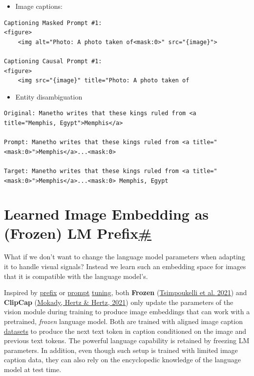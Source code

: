 \begin{itemize}
\tightlist
\item
  Image captions:
\end{itemize}

\begin{verbatim}
Captioning Masked Prompt #1: 
<figure>
    <img alt="Photo: A photo taken of<mask:0>" src="{image}">

Captioning Causal Prompt #1: 
<figure>
    <img src="{image}" title="Photo: A photo taken of
\end{verbatim}

\begin{itemize}
\tightlist
\item
  Entity disambiguation
\end{itemize}

\begin{verbatim}
Original: Manetho writes that these kings ruled from <a title="Memphis, Egypt">Memphis</a>

Prompt: Manetho writes that these kings ruled from <a title="<mask:0>">Memphis</a>...<mask:0>

Target: Manetho writes that these kings ruled from <a title="<mask:0>">Memphis</a>...<mask:0> Memphis, Egypt
\end{verbatim}

\section{\texorpdfstring{Learned Image Embedding as (Frozen) LM Prefix\hyperref[learned-image-embedding-as-frozen-lm-prefix]{\#}}{Learned Image Embedding as (Frozen) LM Prefix\#}}\label{learned-image-embedding-as-frozen-lm-prefix}

What if we don't want to change the language model parameters when adapting it to handle visual signals? Instead we learn such an embedding space for images that it is compatible with the language model's.

Inspired by \href{https://arxiv.org/abs/2101.00190}{prefix} or \href{https://arxiv.org/abs/2104.08691}{prompt} \href{https://lilianweng.github.io/posts/2021-01-02-controllable-text-generation/\#prefix-tuning}{tuning}, both \textbf{Frozen} (\href{https://arxiv.org/abs/2106.13884}{Tsimpoukelli et al. 2021}) and \textbf{ClipCap} (\href{https://arxiv.org/abs/2111.09734}{Mokady, Hertz \& Hertz, 2021}) only update the parameters of the vision module during training to produce image embeddings that can work with a pretrained, \emph{frozen} language model. Both are trained with aligned image caption \hyperref[image-caption-datasets]{datasets} to produce the next text token in caption conditioned on the image and previous text tokens. The powerful language capability is retained by freezing LM parameters. In addition, even though such setup is trained with limited image caption data, they can also rely on the encyclopedic knowledge of the language model at test time.

